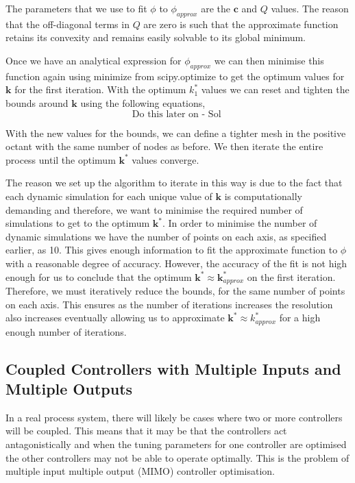 \documentclass[conference]{IEEEtran}
\theoremstyle{definition}
\begin{document}
\noindent The parameters that we use to fit $\phi$ to $\phi_{approx}$ are the $\mathbf{c}$ and $Q$ values. The reason that the off-diagonal terms in $Q$ are zero is such that the approximate function retains its convexity and remains easily solvable to its global minimum. 

\noindent Once we have an analytical expression for $\phi_{approx}$ we can then minimise this function again using minimize from scipy.optimize to get the optimum values for $\mathbf{k}$  for the first iteration. With the optimum $k_1^*$ values we can reset and tighten the bounds around $\mathbf{k}$ using the following equations,
\begin{equation}
    \textrm{Do this later on - Sol }
\end{equation} 

\noindent With the new values for the bounds, we can define a tighter mesh in the positive octant with the same number of nodes as before. We then iterate the entire process until the optimum $\mathbf{k}^*$ values converge. 

\noindent The reason we set up the algorithm to iterate in this way is due to the fact that each dynamic simulation for each unique value of $\mathbf{k}$ is computationally demanding and therefore, we want to minimise the required number of simulations to get to the optimum $\mathbf{k}^*$. In order to minimise the number of dynamic simulations we have the number of points on each axis, as specified earlier, as 10. This gives enough information to fit the approximate function to $\phi$ with a reasonable degree of accuracy. However, the accuracy of the fit is not high enough for us to conclude that the optimum $\mathbf{k}^* \approx \mathbf{k}_{approx}^*$ on the first iteration. Therefore, we must iteratively reduce the bounds, for the same number of points on each axis. This ensures as the number of iterations increases the resolution also increases eventually allowing us to approximate $\mathbf{k}^* \approx k_{approx}^*$ for a high enough number of iterations.

\subsection{Coupled Controllers with Multiple Inputs and Multiple Outputs}
\noindent In a real process system, there will likely be cases where two or more controllers will be coupled. This means that it may be that the controllers act antagonistically and when the tuning parameters for one controller are optimised the other controllers may not be able to operate optimally. This is the problem of multiple input multiple output (MIMO) controller optimisation.
\end{document}
